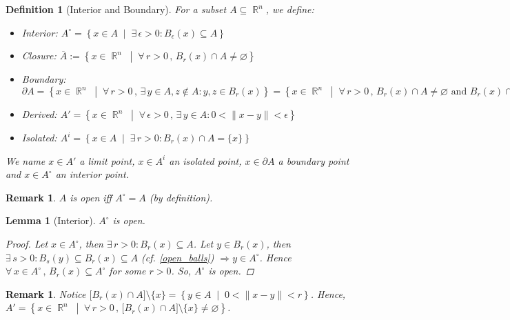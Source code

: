 \documentclass[12pt]{article}
\let\emptyset\varnothing
\let\RA\Rightarrow
\let\ee\epsilon
\newcommand{\set}[2]{\left\{{#1}\;\middle|\;{#2}\right\}}
\newcommand{\Forall}[1]{\forall\,{#1}\,,\,}
\newcommand{\Exist}[1]{\exists\,{#1}:}
\DeclareMathOperator{\R}{\mathbb{R}}
\newcommand{\comp}[2][n]{\R^{#1}\setminus{#2}}
\newcommand{\cl}[1]{\overline{#1}}
\newtheorem{definition}[theorem]{Definition}
\newtheorem{lemma}[theorem]{Lemma}
\newtheorem{remark}[theorem]{Remark}
\begin{document}
\begin{definition}[Interior and Boundary]
  \label{topological_defs}
  For a subset $A\subseteq \R^n$, we define:
  \begin{itemize}
    \item Interior: $A^\circ=\set{x\in A}{\Exist{\ee>0}B_\ee(x)\subseteq A}$
    \item Closure: $\cl{A}:=\set{x\in \R^n}{\Forall{r>0}B_r(x)\cap A\neq \emptyset}$
    \item Boundary: $\partial A=\set{x\in \R^n}{\Forall{r>0}\Exist{y\in A,z\notin A}y,z\in B_r(x)}=\set{x\in \R^n}{\Forall{r>0}B_r(x)\cap A\neq \emptyset\text{ and }B_r(x)\cap (\comp{A})\neq \emptyset}$
    \item Derived: $A'=\set{x\in \R^n}{\Forall{\ee>0}\Exist{y\in A}0<\|x-y\|<\ee}$
    \item Isolated: $A^i=\set{x\in A}{\Exist{r>0}B_r(x)\cap A=\{x\}}$
  \end{itemize}
  We name $x\in A'$ a limit point, $x\in A^i$ an isolated point, $x\in \partial A$ a boundary point and $x\in A^\circ$ an interior point.
\end{definition}

\begin{remark}
  $A$ is open iff $A^\circ = A$ (by definition).
\end{remark}

\begin{lemma}[Interior]
  $A^\circ$ is open.
  \begin{proof}
    Let $x\in A^\circ$, then $\Exist{r>0}B_r(x)\subseteq A$. Let $y\in B_r(x)$, then $\Exist{s>0}B_s(y)\subseteq B_r(x)\subseteq A$ (cf. \ref{open_balls}) $\RA y\in A^\circ$. Hence $\Forall{x\in A^\circ}B_r(x)\subseteq A^\circ$ for some $r>0$. So, $A^\circ$ is open.
  \end{proof}
\end{lemma}

\begin{remark}
  \label{derived_set}
  Notice $\big[B_r(x)\cap A\big]\setminus\{x\}=\set{y\in A}{0<\|x-y\|< r}$. Hence, $A'=\set{x\in\R^n}{\Forall{r>0}\big[B_r(x)\cap A\big]\setminus\{x\}\neq\emptyset}$. 
\end{remark}
\end{document}
